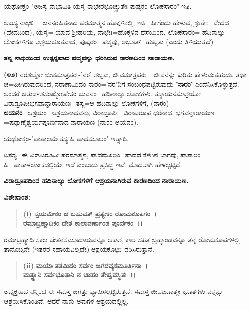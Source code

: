 ಯಥೋಕ್ತಂ-"ಅಜಸ್ಯ ನಾಭಾವಿತಿ ಯಸ್ಯ ನಾಭೇರಭೂಚ್ಛ್ರುತೇಃ ಪುಷ್ಕರಂ ಲೋಕಸಾರಂ" ಇತಿ.

ಅಜಸ್ಯ ನಾಭೌ = ಜನನರಹಿತನಾದ ಪರಮಾತ್ಮನ ಹೊಕ್ಕಳಿನಲ್ಲಿ, ಇತಿ=ಹೀಗೆಂದು ಹೇಳುವ, ಶ್ರುತೇಃ=ವೇದದ (ವೇದದಿಂದ), ಯಸ್ಯ= ಯಾವ ಶ‍್ರೀಹರಿಯ, ನಾಭೇಃ=ಹೊಕ್ಕಳಿನ ದೆಸೆಯಿಂದ, ಲೋಕಸಾರಂ= ಹದಿನಾಲ್ಕು ಲೋಕಗಳಿಗೂ ಆಶ್ರಯಭೂತವಾದ, ಪುಷ್ಕರಂ=\-ಪದ್ಮವು, ಅಭೂತ್=ಹುಟ್ಟಿತು (ಎಂದು ತಿಳಿಯುತ್ತದೆ).

\begin{center}
\textbf{ತನ್ನ ನಾಭಿಯಿಂದ ಉತ್ಪನ್ನವಾದ ಪದ್ಮವನ್ನು ಧರಿಸಿರುವ ಕಾರಣದಿಂದ ನಾರಾಯಣ.}
\end{center}

\textbf{(೪೨)} ನರಶಬ್ದೋ ಜೀವಮಾತ್ರಪರಃ-'ನರ' ಶಬ್ದವು, ಜೀವಮಾತ್ರಪರಃ =ಜೀವನನ್ನು ಕುರಿತು ಹೇಳುವಂತಹುದು. ತಥಾ ಚ=ಹೀಗಿರುವುದರಿಂದ, ನರಾಣಾಮಿದಂ ನಾರಂ='ನರ'\-ನಿಗೆ ಸಂಬಂಧಪಟ್ಟಿರುವುದು \textbf{'ನಾರಂ'} ಎಂದೆನಿಸಿಕೊಳ್ಳುತ್ತದೆ. ಅಂದರೆ ಚತುರ್ದಶಸಂಖ್ಯೋ\-ಪೇತಂ ಭುವನಂ=ಹದಿನಾಲ್ಕು ಲೋಕಗಳು. ತಸ್ಯಾಯನಮಾಶ್ರಯೋ ವಿರಾಡ್ರೂಪೀ\break ಭಗವಾನ್ನಾ\-ರಾಯಣಃ- ತಸ್ಯ=ಆ ಹದಿನಾಲ್ಕು ಲೋಕಗಳಿಗೆ, (ನಾರಂ) \textbf{ಅಯನಂ}=ಆಶ್ರಯಂ\-=ಆಶ್ರಯ\-ನಾದವನು, ವಿರಾಡ್ರೂಪೀ=ವಿರಾಟರೂಪ ಧರನಾದ, ಭಗವನ್ನಾರಾಯಣಃ =\-ಷಡ್ಗುಣೈಶ್ವರ್ಯಪೂರ್ಣನಾದ ನಾರಾಯಣ (ನಾರಂ ಅಯನಂ).

ಯಥೋಕ್ತಂ-"ಪಾತಾಲಮೇತಸ್ಯ ಹಿ ಪಾದಮೂಲಂ" ಇತ್ಯಾದಿ.

ಏತಸ್ಯ=ಈ ವಿರಾಟರೂಪೀ ಪರಮಾತ್ಮನ, ಪಾದಮೂಲಂ=ಪಾದದ ಕೆಳಗಿನ ಭಾಗವು, ಪಾತಾಲಂ ಹಿ=ಪಾತಾಳಲೋಕದಲ್ಲಿಯೇ ಇದೆ ಎಂಬುದು ಪ್ರಸಿದ್ಧ ಇವೇ ಮೊದಲಾಗಿ ಹೇಳಲ್ಪಟ್ಟಿದೆ.

\begin{center}
\textbf{ವಿರಾಡ್ರೂಪದಿಂದ ಹದಿನಾಲ್ಕು ಲೋಕಗಳಿಗೆ ಆಶ್ರಯನಾಗಿರುವ ಕಾರಣದಿಂದ ನಾರಾಯಣ.}
\end{center}

\noindent
\textbf{ವಿಶೇಷಾಂಶ:\enginline{-}}

\begin{verse}
\textbf{(i) ಸ್ವಯಮೇಕಂ ಚ ಬಹುವತ್ ಪ್ರತ್ಯೇಕಂ ರೋಮಕೂಪಗಂ~।}\\\textbf{ರಮಾಬ್ರಹ್ಮಾದಿಕಂ ದೇಶ ಕಾಲಾವರ್ಣಾಂಡ ಪೂರ್ವಕಂ~।।}
\end{verse}


ರಮಾಬ್ರಹ್ಮಾದಿ ಸಕಲ ಚೇತನಸಮೂದಾಯವನ್ನೂ ಆಕಾಶ, ಕಾಲ ಸಹಿತ ಬ್ರಹ್ಮಾಂಡವನ್ನೂ ತನ್ನ ರೋಮಕೂಪಗಳಲ್ಲಿ ತಾನೊಬ್ಬನೇ (ಇತರರ ಸಹಾಯವಿಲ್ಲದೇ) ಆಶ್ರಯಕೊಟ್ಟು ಧರಿಸಿರುತ್ತಾನೆ.

\begin{verse}
\textbf{(ii) ಮಯಾ ತತಮಿದಂ ಸರ್ವಂ ಜಗದವ್ಯಕಮೂರ್ತಿನಾ~।}\\\textbf{ಮತ್ಸ್ಥಾನಿ ಸರ್ವಭೂತಾನಿ ನ ಚಾಹಂ ತೇಷ್ವವಸ್ಥಿತಃ~।।}
\end{verse}

ಅವ್ಯಕ್ತನಾದ ನನ್ನಿಂದ ಈ ಸಮಸ್ತ ಜಗತ್ತು ವ್ಯಾಪಿಸಲ್ಪಟ್ಟಿರುತ್ತದೆ. ಸಮಸ್ತ ಜೀವಜಡಾತ್ಮಕ ಭೂತಗಳು ನನ್ನನ್ನು ಆಶ್ರಯಿಸಿಕೊಂಡಿವೆ. ಆದರೆ ನಾನು ಅವುಗಳ ಆಶ್ರಯದಲ್ಲಿಲ್ಲ.

